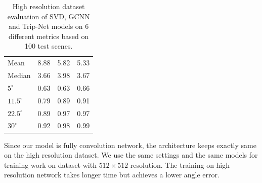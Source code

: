 \begin{table}[H]
	\centering
	\begin{tabular}{l | l l l }
		\toprule
		\tabhead{Metrics} & \tabhead{SVD} & \tabhead{GCNN} & \tabhead{Trip-Net} \\
		\midrule
		Mean  					& 8.88 & 5.82 & 5.33 \\ 
		\hline
		Median					& 3.66 & 3.98 & 3.67 \\ 
		\hline
		$ 5^\circ $ 			& 0.63 & 0.63 & 0.66 \\
		\hline
		$ 11.5^\circ $ 			& 0.79 & 0.89 & 0.91 \\
		\hline
		$ 22.5^\circ $ 			& 0.89 & 0.97 & 0.97 \\
		\hline
		$ 30^\circ $ 			& 0.92 & 0.98 & 0.99 \\
		\bottomrule
	\end{tabular}
	\caption{High resolution dataset evaluation of SVD, GCNN and Trip-Net models on 6 different metrics based on 100 test scenes.}	
	\label{tab:high_resolution_eval}
\end{table}



Since our model is fully convolution network, the architecture keeps exactly same on the high resolution dataset. We use the same settings and the same models for training work on dataset with $ 512\times512 $ resolution. The training on high resolution network takes longer time but achieves a lower angle error. 




